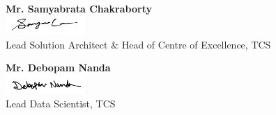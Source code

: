 \begingroup
\singlespacing
\begin{flushright}

\textbf{Mr. Samyabrata Chakraborty}\\
\includegraphics[width=3cm]{images/signature-samyabrata.png}\\
Lead Solution Architect \& Head of Centre of Excellence, TCS

\vspace{2\parskip}

\textbf{Mr. Debopam Nanda}\\
\includegraphics[width=3cm]{images/signature-debopam.png}\\
Lead Data Scientist, TCS

\end{flushright}
\endgroup
\par